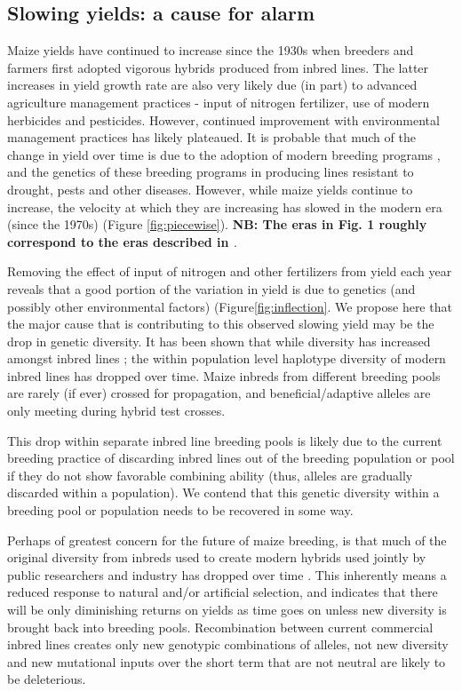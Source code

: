 \documentclass[12pt]{article}
\begin{document}
\subsection*{Slowing yields: a cause for alarm} 

\par Maize yields have continued to increase since the 1930s when breeders and farmers first adopted vigorous hybrids produced from inbred lines. The latter increases in yield growth rate are also very likely due (in part) to advanced agriculture management practices - input of nitrogen fertilizer, use of modern herbicides and pesticides. However, continued improvement with environmental management practices has likely plateaued. It is probable that much of the change in yield over time is due to the adoption of modern breeding programs \citep{Duvick:2001fy}, and the genetics of these breeding programs in producing lines resistant to drought, pests and other diseases. However, while maize yields continue to increase, the velocity at which they are increasing has slowed in the modern era (since the 1970s) (Figure \ref{fig:piecewise}). \textbf{NB: The eras in Fig. 1 roughly correspond to the eras described in \citep{vanHeerwaarden:2012im}}.
\par Removing the effect of input of nitrogen and other fertilizers from yield each year reveals that a good portion of the variation in yield is due to genetics (and possibly other environmental factors) (Figure\ref{fig:inflection}. 
We propose here that the major cause that is contributing to this observed slowing yield may be the drop in genetic diversity. It has been shown that while diversity has increased amongst inbred lines \citep{Gerke:2013tw}; the within population level haplotype diversity of modern inbred lines \citep{vanHeerwaarden:2012im} has dropped over time. Maize inbreds from different breeding pools are rarely (if ever) crossed for propagation, and beneficial/adaptive alleles are only meeting during hybrid test crosses. 
\par This drop within separate inbred line breeding pools is likely due to the current breeding practice of discarding inbred lines out of the breeding population or pool if they do not show favorable combining ability (thus, alleles are gradually discarded within a population).  We contend that this genetic diversity within a breeding pool or population needs to be recovered in some way.  
\par Perhaps of greatest concern for the future of maize breeding, is that much of the original diversity from inbreds used to create modern hybrids used jointly by public researchers and industry has dropped over time \citep{Gerke:2013tw}. This inherently means a reduced response to natural and/or artificial selection, and indicates that there will be only diminishing returns on yields as time goes on unless new diversity is brought back into breeding pools. Recombination between current commercial inbred lines creates only new genotypic combinations of alleles, not new diversity and new mutational inputs over the short term that are not neutral are likely to be deleterious.
\end{document}

